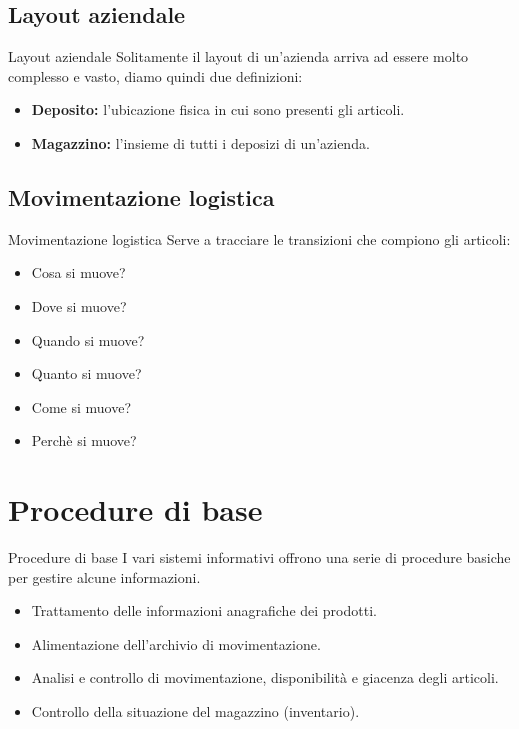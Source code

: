 \documentclass{beamer}
\begin{document}
\subsection{Layout aziendale}
\begin{frame}{Layout aziendale}
    Solitamente il layout di un'azienda arriva ad essere molto complesso e vasto, diamo quindi due definizioni:
    \begin{itemize}
        \item \textbf{Deposito:} l'ubicazione fisica in cui sono presenti gli articoli.
        \item \textbf{Magazzino:} l'insieme di tutti i deposizi di un'azienda.
    \end{itemize}
\end{frame}

\subsection{Movimentazione logistica}
\begin{frame}{Movimentazione logistica}
    Serve a tracciare le transizioni che compiono gli articoli:
    \begin{itemize}
        \item Cosa si muove?
        \item Dove si muove?
        \item Quando si muove?
        \item Quanto si muove?
        \item Come si muove?
        \item Perchè si muove?
    \end{itemize}
\end{frame}

\section{Procedure di base}
\begin{frame}{Procedure di base}
    I vari sistemi informativi offrono una serie di procedure basiche per gestire alcune informazioni.
    \begin{itemize}
        \item Trattamento delle informazioni anagrafiche dei prodotti.
        \item Alimentazione dell'archivio di movimentazione.
        \item Analisi e controllo di movimentazione, disponibilità e giacenza degli articoli.
        \item Controllo della situazione del magazzino (inventario).
    \end{itemize}
\end{frame}
\end{document}
